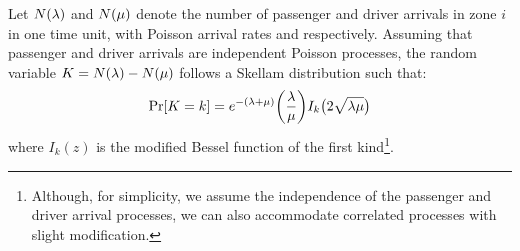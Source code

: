 Let $N(\lambda)$ and $N(\mu)$ denote the number of passenger and driver arrivals in zone $i$ in one time unit, with Poisson arrival rates {\passengerarrivalrate} and {\driverarrivalrate} respectively. Assuming that passenger and driver arrivals are independent Poisson processes, the random variable $K = N(\lambda) - N(\mu)$ follows a Skellam distribution 
such that:
\begin{equation}
\Pr[K=k] = e^{-(\lambda + \mu)} \bigg(\frac{\lambda}{\mu}\bigg) I_k\big(2 \sqrt{\lambda \mu}\big)
\end{equation}
where $I_k(z)$ is the modified Bessel function of the first kind\footnote{Although, for simplicity, we assume the independence of the passenger and driver arrival processes, we can also accommodate correlated processes with slight modification.}.




